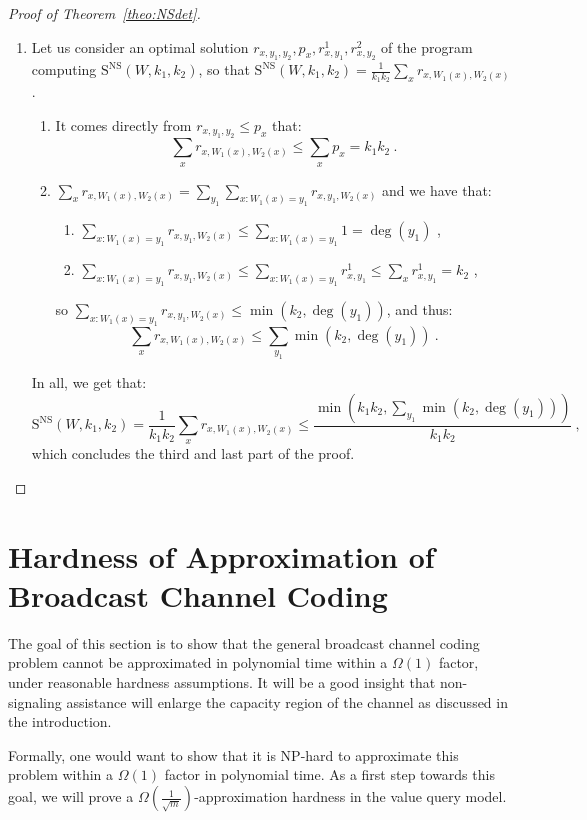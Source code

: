 \begin{proof}[Proof of Theorem~\ref{theo:NSdet}]
\begin{enumerate}
Thus, in particular, there exists some partition $\mathcal{P}_2$ that satisfies the same inequality, which concludes the second part of the proof.

\item Let us consider an optimal solution $r_{x,y_1,y_2},p_x,r^1_{x,y_1},r^2_{x,y_2}$ of the program computing $\mathrm{S}^{\textrm{NS}}(W,k_1,k_2)$, so that $\mathrm{S}^{\textrm{NS}}(W,k_1,k_2) = \frac{1}{k_1k_2}\sum_x r_{x,W_1(x),W_2(x)}$.
  \begin{enumerate}
  \item It comes directly from $r_{x,y_1,y_2} \leq p_x$ that:
    \[ \sum_x r_{x,W_1(x),W_2(x)} \leq \sum_x p_x = k_1k_2 \ . \]
  \item $\sum_x r_{x,W_1(x),W_2(x)} = \sum_{y_1}\sum_{x:W_1(x)=y_1} r_{x,y_1,W_2(x)}$ and we have that:
    \begin{enumerate}
    \item $\sum_{x:W_1(x)=y_1} r_{x,y_1,W_2(x)} \leq \sum_{x:W_1(x)=y_1} 1 = \deg(y_1)$ ,
    \item $\sum_{x:W_1(x)=y_1} r_{x,y_1,W_2(x)} \leq \sum_{x:W_1(x)=y_1} r^1_{x,y_1} \leq \sum_x r^1_{x,y_1} = k_2$ ,
    \end{enumerate}
    so $\sum_{x:W_1(x)=y_1} r_{x,y_1,W_2(x)} \leq \min(k_2,\deg(y_1))$, and thus:
    \[ \sum_x r_{x,W_1(x),W_2(x)} \leq \sum_{y_1}\min(k_2,\deg(y_1)) \ .\]
  \end{enumerate}

  In all, we get that:
  \[ \mathrm{S}^{\textrm{NS}}(W,k_1,k_2) = \frac{1}{k_1k_2}\sum_x r_{x,W_1(x),W_2(x)} \leq \frac{\min\left(k_1k_2,\sum_{y_1}\min(k_2,\deg(y_1))\right)}{k_1k_2} \ , \]
  which concludes the third and last part of the proof.
  \end{enumerate}
\end{proof}

\section{Hardness of Approximation of Broadcast Channel Coding}
\label{section:HardnessBC}
The goal of this section is to show that the general broadcast channel coding problem cannot be approximated in polynomial time within a $\Omega(1)$ factor, under reasonable hardness assumptions. It will be a good insight that non-signaling assistance will enlarge the capacity region of the channel as discussed in the introduction.

Formally, one would want to show that it is \textrm{NP}-hard to approximate this problem within a $\Omega(1)$ factor in polynomial time. As a first step towards this goal, we will prove a $\Omega\left(\frac{1}{\sqrt{m}}\right)$-approximation hardness in the value query model.

